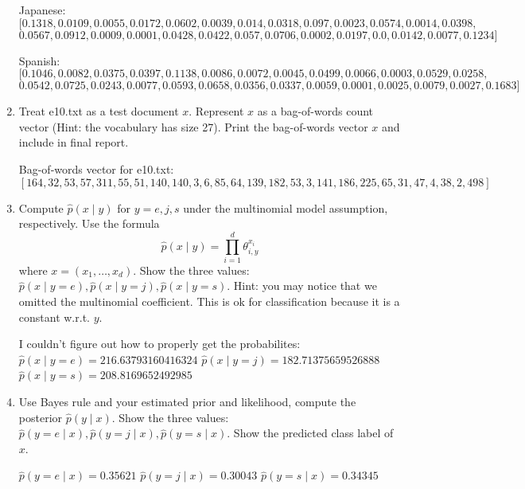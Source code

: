 \documentclass[a4paper]{article}
\theoremstyle{definition}
\newenvironment{soln}{
    \leavevmode\color{blue}\ignorespaces
}{}
\begin{document}
\begin{enumerate}
\begin{soln}
    Japanese:
    $$[0.1318, 0.0109, 0.0055, 0.0172, 0.0602, 0.0039, 0.014, 0.0318, 0.097, 0.0023, 0.0574, 0.0014, 0.0398,$$
    $$0.0567, 0.0912, 0.0009, 0.0001, 0.0428, 0.0422, 0.057, 0.0706, 0.0002, 0.0197, 0.0, 0.0142, 0.0077, 0.1234]$$

    Spanish:
    $$[0.1046, 0.0082, 0.0375, 0.0397, 0.1138, 0.0086, 0.0072, 0.0045, 0.0499, 0.0066, 0.0003, 0.0529, 0.0258,$$
    $$0.0542, 0.0725, 0.0243, 0.0077, 0.0593, 0.0658, 0.0356, 0.0337, 0.0059, 0.0001, 0.0025, 0.0079, 0.0027, 0.1683]$$

\end{soln}


\item
Treat e10.txt as a test document $x$.
Represent $x$ as a bag-of-words count vector (Hint: the vocabulary has size 27).
Print the bag-of-words vector $x$ and include in final report.

\begin{soln}
    Bag-of-words vector for e10.txt: \\
    $$[164, 32, 53, 57, 311, 55, 51, 140, 140, 3, 6, 85, 64, 139, 182, 53, 3, 141, 186, 225, 65, 31, 47, 4, 38, 2, 498]$$
\end{soln}

\item
Compute $\hat p(x \mid y)$ for $y=e, j, s$ under the multinomial model assumption, respectively.
Use the formula
$$\hat p(x \mid y) = \prod_{i=1}^d \theta_{i, y}^{x_i}$$
where $x=(x_1, \ldots, x_d)$.
Show the three values: $\hat p(x \mid y=e), \hat p(x \mid y=j), \hat p(x \mid y=s)$.
Hint: you may notice that we omitted the multinomial coefficient.  This is ok for classification because it is a constant w.r.t. $y$.

\begin{soln}
    I couldn't figure out how to properly get the probabilites:
    $\hat p(x \mid y=e) = 216.63793160416324$
    $\hat p(x \mid y=j) = 182.71375659526888$
    $\hat p(x \mid y=s) = 208.8169652492985$
\end{soln}

\item
Use Bayes rule and your estimated prior and likelihood, compute the posterior $\hat p(y \mid x)$.
Show the three values: $\hat p(y=e \mid x), \hat p(y=j \mid x), \hat p(y=s \mid x)$.
Show the predicted class label of $x$.

\begin{soln}
    $\hat p(y=e \mid x) = 0.35621$
    $\hat p(y=j \mid x) = 0.30043$
    $\hat p(y=s \mid x) = 0.34345$


\end{soln}
\end{enumerate}
\end{document}
